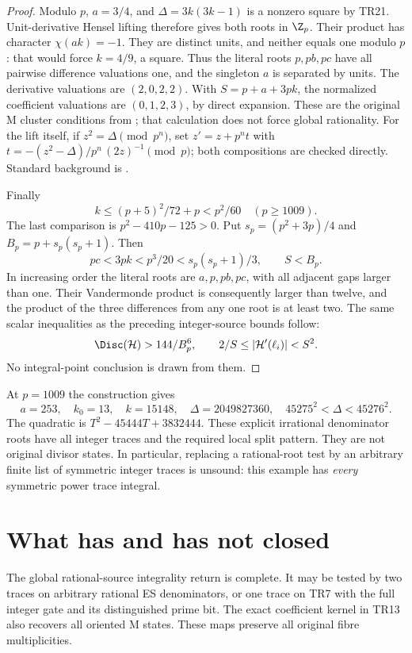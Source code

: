\begin{proof}
Modulo $p$, $a=3/4$, and
$\Delta=3k(3k-1)$ is a nonzero square by TR21. Unit-derivative Hensel lifting
therefore gives both roots in $\Z_p$. Their product has character
$\chi(ak)=-1$. They are distinct units, and neither equals one modulo $p$:
that would force $k=4/9$, a square. Thus the literal roots $p,pb,pc$ have all
pairwise difference valuations one, and the singleton $a$ is separated by
units. The derivative valuations are $(2,0,2,2)$. With
$S=p+a+3pk$, the normalized coefficient valuations are $(0,1,2,3)$, by direct
expansion. These are the original M cluster conditions from
\cite[IC7, IC14]{Previous}; that calculation does not force global rationality.
For the lift itself, if $z^2=\Delta\pmod{p^n}$, set
$z'=z+p^nt$ with $t=-(z^2-\Delta)/p^n\,(2z)^{-1}\pmod p$; both compositions
are checked directly. Standard background is \cite[Chapter 7]{Milne}.

Finally
\[
 k\le(p+5)^2/72+p<p^2/60\quad(p\ge1009).
\]
The last comparison is $p^2-410p-125>0$. Put
$s_p=(p^2+3p)/4$ and $B_p=p+s_p(s_p+1)$. Then
\[
 pc<3pk<p^3/20<s_p(s_p+1)/3,\qquad S<B_p.
\]
In increasing order the literal roots are $a,p,pb,pc$, with all adjacent gaps
larger than one. Their Vandermonde product is consequently larger than twelve,
and the product of the three differences from any one root is at least two.
The same scalar inequalities as the preceding integer-source bounds follow:
\[
 \Disc(\mathcal H)>144/B_p^6,\qquad
 2/S\le|\mathcal H'(\ell_i)|<S^2.
\]
No integral-point conclusion is drawn from them.
\end{proof}

At $p=1009$ the construction gives
\[
 a=253,\quad k_0=13,\quad k=15148,\quad
 \Delta=2049827360,\quad
 45275^2<\Delta<45276^2.
\]
The quadratic is $T^2-45444T+3832444$. These explicit irrational denominator
roots have all integer traces and the required local split pattern. They are
not original divisor states. In particular, replacing a rational-root test by
an arbitrary finite list of symmetric integer traces is unsound: this example
has \emph{every} symmetric power trace integral.

\section{What has and has not closed}
The global rational-source integrality return is complete. It may be tested by
two traces on arbitrary rational ES denominators, or one trace on TR7 with the
full integer gate and its distinguished prime bit. The exact coefficient kernel
in TR13 also recovers all oriented M states. These maps preserve all original
fibre multiplicities.

